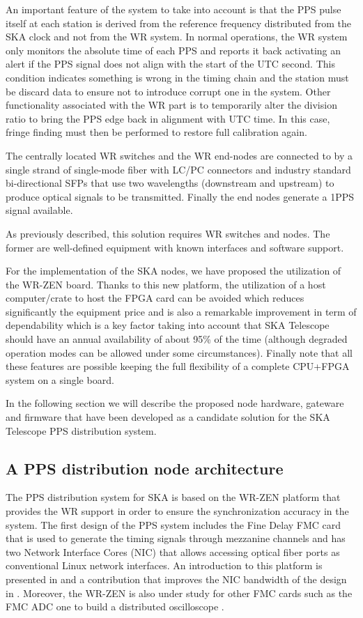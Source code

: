 An important feature of the system to take into account is that the PPS pulse itself at each station is derived from the reference frequency distributed from the SKA clock and not from the WR system. In normal operations, the WR system only monitors the absolute time of each PPS and reports it back activating an alert if the PPS signal does not align with the start of the UTC second. This condition indicates something is wrong in the timing chain and the station must be discard data to ensure not to introduce corrupt one in the system. Other functionality associated with the WR part is to temporarily alter the division ratio to bring the PPS edge back in alignment with UTC time. In this case, fringe finding must then be performed to restore full calibration again.

The centrally located WR switches and the WR end-nodes are connected to by a 
single strand of single-mode fiber with LC/PC connectors and industry standard 
bi-directional SFPs that use two wavelengths (downstream and upstream) to produce 
optical signals to be transmitted. Finally the end nodes generate a 1PPS signal available. 

As previously described, this solution requires WR switches and nodes. The former are well-defined equipment with known interfaces and software support. 

For the implementation of the SKA nodes, we have proposed the utilization of the WR-ZEN board. Thanks to this new platform, the utilization of a host computer/crate to host the FPGA card can be avoided which reduces significantly the equipment price and is also a remarkable improvement in term of dependability which is a key factor taking into account that SKA Telescope should have an annual availability of about 95\% of the time (although degraded operation modes can be allowed under some circumstances).
Finally note that all these features are possible keeping the full flexibility of a complete CPU+FPGA system on a single board. 

In the following section we will describe the proposed node hardware, gateware and firmware that have been developed as a candidate solution for the SKA Telescope PPS distribution system. 

\subsection{A PPS distribution node architecture} \label{subsec:ska-pps-system-arch}

The PPS distribution system for SKA is based on the WR-ZEN platform that provides the WR support in order to ensure the synchronization accuracy in the system. The first design of the PPS system includes the Fine Delay FMC card that is used to generate the timing signals through mezzanine channels and has two Network Interface Cores (NIC) that allows accessing optical fiber ports as conventional Linux network interfaces. An introduction to this platform is presented in \cite{migueljl-paper-wr-zen-intro} and a contribution that improves the NIC bandwidth of the design in \cite{jorgesg-paper-wr-zen-dma}. Moreover, the WR-ZEN is also under study for other FMC cards such as the FMC ADC one to build a distributed oscilloscope \cite{joselj-paper-wr-zen-adc}.

